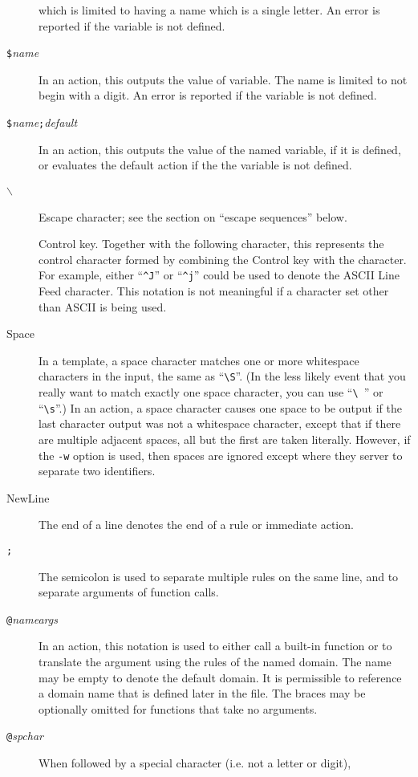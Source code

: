 \begin{description}
which is limited to having a name which is a single letter.
An error is reported if the variable is not defined.
\item[{\tt \$\ttlb }{\it name}{\tt \ttrb }]
In an action, this outputs the value of variable.  The name is limited
to not begin with a digit.  An error is reported if the variable is not
defined.
\item[{\tt \$\ttlb }{\it name}{\tt ;}{\it default}{\tt \ttrb }]
In an action, this outputs the value of the named variable, if it is
defined, or evaluates the default action if the the variable is not defined.
\item[{\tt $\backslash$ }]
Escape character; see the section on ``escape sequences'' below.
\item[\tt \ttcaret]
Control key.  Together with the following character, this represents the
control character formed by combining the Control key with the character.
For example, either ``\verb/^J/'' or ``\verb/^j/'' could be used to
denote the ASCII Line Feed character.  This notation is not meaningful if a
character set other than ASCII is being used.
\item[Space]
In a template, a space character matches one or more whitespace
characters in the input, the same as ``\verb|\S|''.
(In the less likely event that you really want to
match exactly one space character, you can use ``\verb/\ /'' or
``\verb/\s/''.) 
In an action, a space character causes one space to be output if the
last character output was not a whitespace character, except that if
there are multiple adjacent spaces, all but the first are taken literally.
However, if the \verb/-w/ option is used, then spaces are ignored except
where they server to separate two identifiers.
\item[NewLine]
The end of a line denotes the end of a rule or immediate action.
\item[{\tt ;}]
The semicolon is used to separate multiple rules on the same line, and
to separate arguments of function calls.
\item[{\tt @}{\it name}{\tt \ttlb }{\it args}{\tt \ttrb }]
In an action, this notation is used to either call a built-in function
or to translate the argument using the rules of the named domain.
The name may be empty to denote the default domain.
It is permissible to reference a domain name that is defined later in the
file. 
The braces may be optionally omitted for functions that take no arguments.
\item[{\tt @}{\it spchar}]
When followed by a special character (i.e. not a letter or digit),

\end{description}

